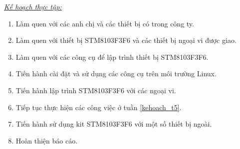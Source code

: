 \pagebreak
\underline{\textit{Kế hoạch thực tập:}}
\begin{enumerate}[label={-- Tuần \theenumi:}, leftmargin=2.5cm, ref={\theenumi}]
\item Làm quen với các anh chị và  các thiết bị có trong công ty.
\item Làm quen với thiết bị STM8103F3F6 và các thiết bị ngoại vi được giao.
\item Làm quen với các công cụ để lập trình thiết bị STM8103F3F6.
\item Tiến hành cài đặt và sử dụng các công cụ trên môi trường Linux.
\item Tiến hành lập trình STM8103F3F6 với các ngoại vi.\label{kehoach_t5}
\item Tiếp tục thực hiện các công việc ở tuần \ref{kehoach_t5}.
\item Tiến hành sử dụng kit STM8103F3F6 với một số thiết bị ngoài.
\item Hoàn thiện báo cáo.
\end{enumerate}
